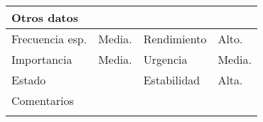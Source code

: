\documentclass{article}
\begin{document}
\begin{table}[h]
\begin{tabular}{|l|l|l|l|l|l|}
\hline
\multicolumn{6}{|p{10cm}|}{Otros datos}\\
\hline
\multicolumn{1}{|p{2cm}|}{Frecuencia esp.} & \multicolumn{2}{p{3cm}}{Media.} & \multicolumn{1}{|p{2cm}|}{Rendimiento} & \multicolumn{2}{p{3cm}|}{Alto.}\\
\hline
\multicolumn{1}{|p{2cm}|}{Importancia} & \multicolumn{2}{p{3cm}}{Media.} & \multicolumn{1}{|p{2cm}|}{Urgencia} & \multicolumn{2}{p{3cm}|}{Media.}\\
\hline
\multicolumn{1}{|p{2cm}|}{Estado} & \multicolumn{2}{p{3cm}}{} & \multicolumn{1}{|p{2cm}|}{Estabilidad} & \multicolumn{2}{p{3cm}|}{Alta.}\\
\hline
\multicolumn{6}{|p{10cm}|}{Comentarios}\\
\hline
\multicolumn{6}{|p{10cm}|}{}\\
\hline
\end{tabular}
\end{table}
\addtocounter{ni}{1}
\end{document}
